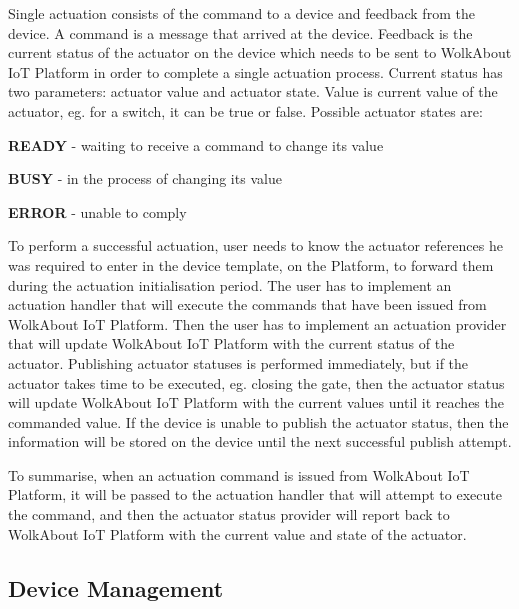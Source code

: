 Single actuation consists of the command to a device and feedback from the device. A command is a message that arrived at the device. Feedback is the current status of the actuator on the device which needs to be sent to Wolk\+About IoT Platform in order to complete a single actuation process. Current status has two parameters\+: actuator value and actuator state. Value is current value of the actuator, eg. for a switch, it can be true or false. Possible actuator states are\+:


\begin{DoxyItemize}
\item {\bfseries R\+E\+A\+DY} -\/ waiting to receive a command to change its value
\item {\bfseries B\+U\+SY} -\/ in the process of changing its value
\item {\bfseries E\+R\+R\+OR} -\/ unable to comply
\end{DoxyItemize}

To perform a successful actuation, user needs to know the actuator references he was required to enter in the device template, on the Platform, to forward them during the actuation initialisation period. The user has to implement an actuation handler that will execute the commands that have been issued from Wolk\+About IoT Platform. Then the user has to implement an actuation provider that will update Wolk\+About IoT Platform with the current status of the actuator. Publishing actuator statuses is performed immediately, but if the actuator takes time to be executed, eg. closing the gate, then the actuator status will update Wolk\+About IoT Platform with the current values until it reaches the commanded value. If the device is unable to publish the actuator status, then the information will be stored on the device until the next successful publish attempt.

To summarise, when an actuation command is issued from Wolk\+About IoT Platform, it will be passed to the actuation handler that will attempt to execute the command, and then the actuator status provider will report back to Wolk\+About IoT Platform with the current value and state of the actuator.

\label{_device-managment}%
 \subsection*{Device Management}



 

